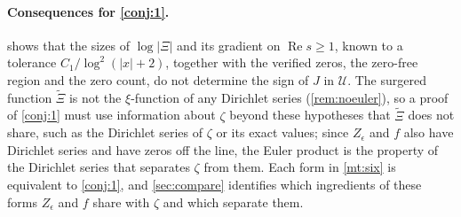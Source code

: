 \documentclass[11pt]{article}
\theoremstyle{definition}\newtheorem{definition}[theorem]{Definition}
\theoremstyle{remark}\newtheorem{remark}[theorem]{Remark}
\renewcommand{\Re}{\operatorname{Re}}\renewcommand{\Im}{\operatorname{Im}}
\begin{document}
\paragraph{Consequences for \cref{conj:1}.}  shows that the sizes of $\log|\Xi|$ and its gradient on $\Re s\ge1$, known to a tolerance $C_1/\log^2(|x|+2)$, together with the verified zeros, the zero-free region and the zero count, do not determine the sign of $J$ in $\mathcal U$. The surgered function $\widetilde\Xi$ is not the $\xi$-function of any Dirichlet series (\cref{rem:noeuler}), so a proof of \cref{conj:1} must use information about $\zeta$ beyond these hypotheses that $\widetilde\Xi$ does not share, such as the Dirichlet series of $\zeta$ or its exact values; since $Z_\epsilon$ and $f$ also have Dirichlet series and have zeros off the line, the Euler product is the property of the Dirichlet series that separates $\zeta$ from them. Each form in \cref{mt:six} is equivalent to \cref{conj:1}, and \cref{sec:compare} identifies which ingredients of these forms $Z_\epsilon$ and $f$ share with $\zeta$ and which separate them.
\end{document}
